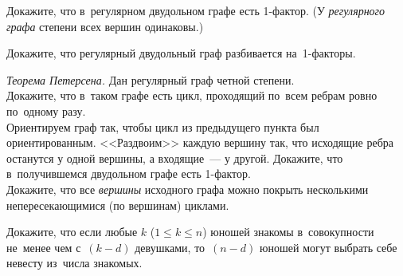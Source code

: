 \begin{problems}

\item
Докажите, что в~регулярном двудольном графе есть 1-фактор.
(У \emph{регулярного графа} степени всех вершин одинаковы.)

\item
Докажите, что регулярный двудольный граф разбивается на~1-факторы.

\item\emph{Теорема Петерсена.}
Дан регулярный граф четной степени.
\\
\subproblemx{$^\circ$}
Докажите, что в~таком графе есть цикл, проходящий по~всем ребрам ровно
по~одному разу.
\\
\subproblem
Ориентируем граф так, чтобы цикл из предыдущего пункта был ориентированным.
<<Раздвоим>> каждую вершину так, что исходящие ребра останутся у одной вершины,
а входящие~--- у другой.
Докажите, что в~получившемся двудольном графе есть 1-фактор.
\\
\subproblem
Докажите, что все \emph{вершины} исходного графа можно покрыть несколькими
непересекающимися (по вершинам) циклами.

\item
Докажите, что если любые $k$ ($1 \leq k \leq n$) юношей знакомы в~совокупности
не~менее чем с~$(k - d)$ девушками, то~$(n - d)$ юношей могут выбрать себе
невесту из~числа знакомых.

\end{problems}

\endgroup %

